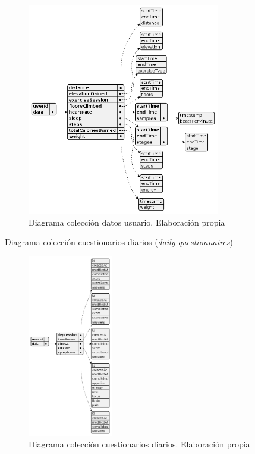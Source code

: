 \begin{figure}[h]
    \centering
    \includegraphics[width=0.75\textwidth]{figures/bd/Servidor user data.png}
    \caption[Diagrama colección datos usuario]{Diagrama colección datos usuario. Elaboración propia}
    \label{figure:disenio:diagrama_user_data}
\end{figure}

Diagrama colección cuestionarios diarios (\textit{daily questionnaires})

\begin{figure}[h]
    \centering
    \includegraphics[width=0.33\textwidth]{figures/bd/Servidor daily questionnaires.png}
    \caption[Diagrama colección cuestionarios diarios]{Diagrama colección cuestionarios diarios. Elaboración propia}
    \label{figure:disenio:diagrama_daily}
\end{figure}

